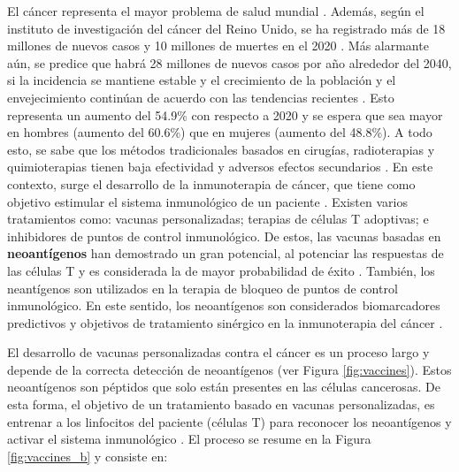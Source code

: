 \documentclass[a4paper]{article}
\begin{document}
	El cáncer representa el mayor problema de salud mundial \citep{siegel2023cancer}. Además, según el instituto de investigación del cáncer del Reino Unido, se ha registrado más de 18 millones de nuevos casos y 10 millones de muertes en el 2020 \citep{cancerUK2023}. Más alarmante aún, se predice que habrá 28 millones de nuevos casos por año alrededor del 2040, si la incidencia se mantiene estable y el crecimiento de la población y el envejecimiento continúan de acuerdo con las tendencias recientes \citep{cancerUK2023_2}. Esto representa un aumento del 54.9\% con respecto a 2020 y se espera que sea mayor en hombres (aumento del 60.6\%) que en mujeres (aumento del 48.8\%).	A todo esto, se sabe que los métodos tradicionales basados en cirugías, radioterapias y quimioterapias tienen baja efectividad y adversos efectos secundarios \citep{peng2019neoantigen}. En este contexto, surge el desarrollo de la inmunoterapia de cáncer, que tiene como objetivo estimular el sistema inmunológico de un paciente \citep{borden2022cancer}. Existen varios tratamientos como: vacunas personalizadas; terapias de células T adoptivas; e inhibidores de puntos de control inmunológico. De estos, las vacunas basadas en \textbf{neoantígenos} han demostrado un gran potencial, al potenciar las respuestas de las células T y es considerada la de mayor probabilidad de éxito \citep{borden2022cancer}. También, los neantígenos son utilizados en la terapia de bloqueo de puntos de control inmunológico. En este sentido, los neoantígenos son considerados biomarcadores predictivos y objetivos de tratamiento sinérgico en la inmunoterapia del cáncer \citep{fang2022neoantigens}.
	
	
	
	
	El desarrollo de vacunas personalizadas contra el cáncer es un proceso largo y depende de la correcta detección de neoantígenos (ver Figura \ref{fig:vaccines}). Estos neoantígenos son péptidos que solo están presentes en las células cancerosas. De esta forma, el objetivo de un tratamiento basado en vacunas personalizadas, es entrenar a los linfocitos del paciente (células T) para reconocer los neoantígenos y activar el sistema inmunológico \citep{de2020neoantigen, peng2019neoantigen}. El proceso se resume en la Figura \ref{fig:vaccines_b} y consiste en: 
	
	
	
\end{document}
